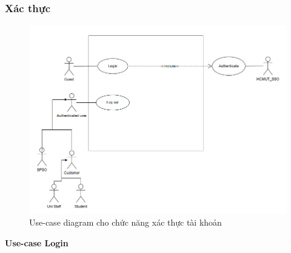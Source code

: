 \subsubsection{Xác thực}
\begin{figure}[H]
    \begin{center}
        \includegraphics[width=1\textwidth]{Images/Requirement Elicitation/Authentication_Use-case.png}
        \caption{Use-case diagram cho chức năng xác thực tài khoản}
    \end{center}
\end{figure}
\pagebreak
{}
\textbf{Use-case Login}\par
\vspace{0.5cm}
